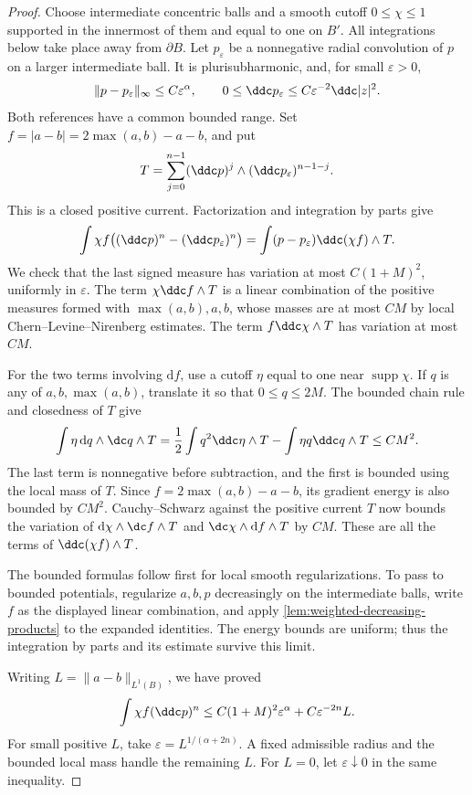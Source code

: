 \begin{proof}
Choose intermediate concentric balls and a smooth cutoff $0\leq\chi\leq1$ supported in the innermost of them and equal to one on $B'$. All integrations below take place away from $\partial B$. Let $p_\varepsilon$ be a nonnegative radial convolution of $p$ on a larger intermediate ball. It is plurisubharmonic, and, for small $\varepsilon>0$,
\[
 \|p-p_\varepsilon\|_\infty\leq C\varepsilon^\alpha,
 \qquad 0\leq\ddc p_\varepsilon\leq C\varepsilon^{-2}\ddc|z|^2.
\]
Both references have a common bounded range. Set $f=|a-b|=2\max(a,b)-a-b$, and put
\[
 T=\sum_{j=0}^{n-1}(\ddc p)^j\wedge(\ddc p_\varepsilon)^{n-1-j}.
\]
This is a closed positive current. Factorization and integration by parts give
\[
 \int\chi f\bigl((\ddc p)^n-(\ddc p_\varepsilon)^n\bigr)
 =\int(p-p_\varepsilon)\ddc(\chi f)\wedge T.
\]
We check that the last signed measure has variation at most $C(1+M)^2$, uniformly in $\varepsilon$. The term $\chi\ddc f\wedge T$ is a linear combination of the positive measures formed with $\max(a,b),a,b$, whose masses are at most $CM$ by local Chern--Levine--Nirenberg estimates. The term $f\ddc\chi\wedge T$ has variation at most $CM$.

For the two terms involving $\mathrm df$, use a cutoff $\eta$ equal to one near $\operatorname{supp}\chi$. If $q$ is any of $a,b,\max(a,b)$, translate it so that $0\leq q\leq2M$. The bounded chain rule and closedness of $T$ give
\[
 \int\eta\,\mathrm dq\wedge\dc q\wedge T
 =\frac12\int q^2\ddc\eta\wedge T
       -\int\eta q\ddc q\wedge T\leq CM^2.
\]
The last term is nonnegative before subtraction, and the first is bounded using the local mass of $T$. Since $f=2\max(a,b)-a-b$, its gradient energy is also bounded by $CM^2$. Cauchy--Schwarz against the positive current $T$ now bounds the variation of $\mathrm d\chi\wedge\dc f\wedge T$ and $\dc\chi\wedge\mathrm df\wedge T$ by $CM$. These are all the terms of $\ddc(\chi f)\wedge T$.

The bounded formulas follow first for local smooth regularizations. To pass to bounded potentials, regularize $a,b,p$ decreasingly on the intermediate balls, write $f$ as the displayed linear combination, and apply \cref{lem:weighted-decreasing-products} to the expanded identities. The energy bounds are uniform; thus the integration by parts and its estimate survive this limit.

Writing $L=\|a-b\|_{L^1(B)}$, we have proved
\begin{equation}\label{eq:holder-reference-local-balance}
 \int\chi f(\ddc p)^n
 \leq C(1+M)^2\varepsilon^\alpha+C\varepsilon^{-2n}L.
\end{equation}
For small positive $L$, take $\varepsilon=L^{1/(\alpha+2n)}$. A fixed admissible radius and the bounded local mass handle the remaining $L$. For $L=0$, let $\varepsilon\downarrow0$ in the same inequality.
\end{proof}

